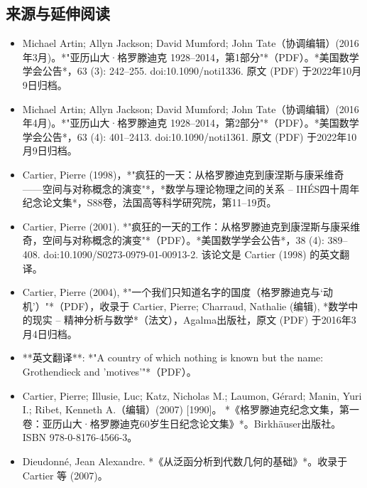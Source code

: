 \subsection{来源与延伸阅读}
\begin{itemize}
\item Michael Artin; Allyn Jackson; David Mumford; John Tate（协调编辑）(2016年3月)。*"亚历山大·格罗滕迪克 1928–2014，第1部分"*（PDF）。*美国数学学会公告*，63 (3): 242–255. doi:10.1090/noti1336. 原文 (PDF) 于2022年10月9日归档。  
\item Michael Artin; Allyn Jackson; David Mumford; John Tate（协调编辑）(2016年4月)。*"亚历山大·格罗滕迪克 1928–2014，第2部分"*（PDF）。*美国数学学会公告*，63 (4): 401–2413. doi:10.1090/noti1361. 原文 (PDF) 于2022年10月9日归档。  
\item Cartier, Pierre (1998)，*"疯狂的一天：从格罗滕迪克到康涅斯与康采维奇——空间与对称概念的演变"*，*数学与理论物理之间的关系 – IHÉS四十周年纪念论文集*，S88卷，法国高等科学研究院，第11–19页。  
\item Cartier, Pierre (2001). *"疯狂的一天的工作：从格罗滕迪克到康涅斯与康采维奇，空间与对称概念的演变"*（PDF）。*美国数学学会公告*，38 (4): 389–408. doi:10.1090/S0273-0979-01-00913-2. 该论文是 Cartier (1998) 的英文翻译。  
\item Cartier, Pierre (2004), *"一个我们只知道名字的国度（格罗滕迪克与‘动机’）"*（PDF），收录于 Cartier, Pierre; Charraud, Nathalie (编辑), *数学中的现实 – 精神分析与数学*（法文），Agalma出版社，原文 (PDF) 于2016年3月4日归档。  
\item **英文翻译**: *"A country of which nothing is known but the name: Grothendieck and 'motives'"*（PDF）。 
\item Cartier, Pierre; Illusie, Luc; Katz, Nicholas M.; Laumon, Gérard; Manin, Yuri I.; Ribet, Kenneth A.（编辑）(2007) [1990]。 *《格罗滕迪克纪念文集，第一卷：亚历山大·格罗滕迪克60岁生日纪念论文集》*。Birkhäuser出版社。ISBN 978-0-8176-4566-3。
\item Dieudonné, Jean Alexandre. *《从泛函分析到代数几何的基础》*。收录于 Cartier 等 (2007)。
\end{itemize}